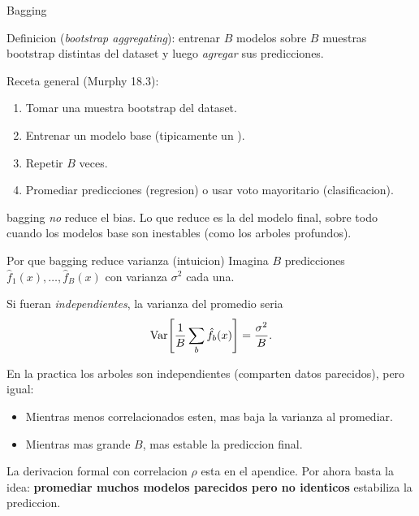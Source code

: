 \begin{frame}{Bagging}
\begin{block}{Definicion}
\small
{} (\textit{bootstrap aggregating}): entrenar $B$ modelos sobre $B$ muestras bootstrap distintas del dataset y luego \emph{agregar} sus predicciones.
\end{block}

\vspace{0.3em}
Receta general (Murphy 18.3):
\begin{enumerate}\small
  \item Tomar una muestra bootstrap del dataset.
  \item Entrenar un modelo base (tipicamente un ).
  \item Repetir $B$ veces.
  \item Promediar predicciones (regresion) o usar voto mayoritario (clasificacion).
\end{enumerate}

\vspace{0.3em}
 bagging \emph{no} reduce el bias. Lo que reduce es la  del modelo final, sobre todo cuando los modelos base son inestables (como los arboles profundos).
\end{frame}

\begin{frame}{Por que bagging reduce varianza (intuicion)}
Imagina $B$ predicciones $\hat f_1(x),\dots,\hat f_B(x)$ con varianza $\sigma^2$ cada una.

\vspace{0.3em}
Si fueran \emph{independientes}, la varianza del promedio seria
\[
\mathrm{Var}\!\left[\frac{1}{B}\sum_b \hat f_b(x)\right] = \frac{\sigma^2}{B}.
\]

\vspace{0.3em}
En la practica los arboles  son independientes (comparten datos parecidos), pero igual:
\begin{itemize}\small
  \item Mientras menos correlacionados esten, mas baja la varianza al promediar.
  \item Mientras mas grande $B$, mas estable la prediccion final.
\end{itemize}

\vspace{0.3em}
{\footnotesize La derivacion formal con correlacion $\rho$ esta en el apendice. Por ahora basta la idea: \textbf{promediar muchos modelos parecidos pero no identicos} estabiliza la prediccion.}
\end{frame}


